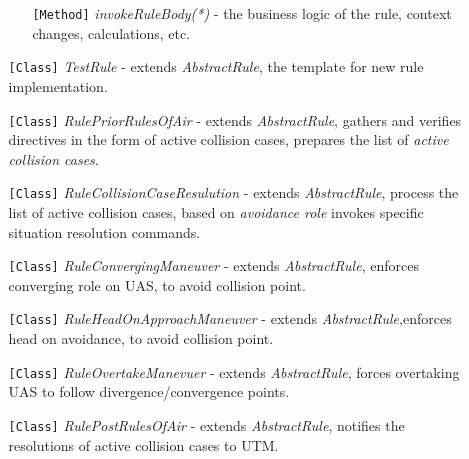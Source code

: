 \begin{itemize}
\begin{itemize}
\begin{itemize}
            \item[\texttt{[Method]}] \emph{invokeRuleBody(*)} - the business logic of the rule, context changes, calculations, etc.
        \end{itemize}
        
        \item[\texttt{[Class]}] \emph{TestRule} - extends \emph{AbstractRule}, the template for new rule implementation.
        
        \item[\texttt{[Class]}] \emph{RulePriorRulesOfAir} - extends \emph{AbstractRule}, gathers and verifies directives in the form of active collision cases, prepares the list of \emph{active collision cases}.
        
        \item[\texttt{[Class]}] \emph{RuleCollisionCaseResulution} - extends \emph{AbstractRule}, process the list of active collision cases, based on \emph{avoidance role} invokes specific situation resolution commands.
        
        \item[\texttt{[Class]}] \emph{RuleConvergingManeuver} - extends \emph{AbstractRule}, enforces converging role on UAS, to avoid collision point. 
        
        \item[\texttt{[Class]}] \emph{RuleHeadOnApproachManeuver} - extends \emph{AbstractRule},enforces head on avoidance, to avoid collision point. 
        
        \item[\texttt{[Class]}] \emph{RuleOvertakeManevuer} - extends \emph{AbstractRule}, forces overtaking UAS to follow divergence/convergence points.
        
        \item[\texttt{[Class]}] \emph{RulePostRulesOfAir} - extends \emph{AbstractRule}, notifies the resolutions of active collision cases to UTM.
    \end{itemize}
\end{itemize}

